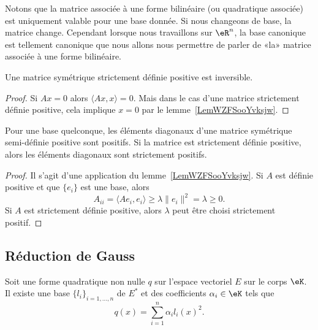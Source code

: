 \begin{normaltext}
    Notons que la matrice associée à une forme bilinéaire (ou quadratique associée) est uniquement valable pour une base donnée. Si nous changeons de base, la matrice change. Cependant lorsque nous travaillons sur \( \eR^n\), la base canonique est tellement canonique que nous allons nous permettre de parler de «la» matrice associée à une forme bilinéaire.
\end{normaltext}

\begin{corollary}
    Une matrice symétrique strictement définie positive est inversible.
\end{corollary}

\begin{proof}
    Si \( Ax=0\) alors \( \langle Ax, x\rangle =0\). Mais dans le cas d'une matrice strictement définie positive, cela implique \( x=0\) par le lemme~\ref{LemWZFSooYvksjw}.
\end{proof}

\begin{lemma}
    Pour une base quelconque, les éléments diagonaux d'une matrice symétrique semi-définie positive sont positifs. Si la matrice est strictement définie positive, alors les éléments diagonaux sont strictement positifs.
\end{lemma}

\begin{proof}
    Il s'agit d'une application du lemme~\ref{LemWZFSooYvksjw}. Si \( A\) est définie positive et que \( \{ e_i \}\) est une base, alors
    \begin{equation}
        A_{ii}=\langle Ae_i, e_i\rangle \geq \lambda\| e_i \|^2=\lambda\geq 0.
    \end{equation}
    Si \( A\) est strictement définie positive, alors \( \lambda\) peut être choisi strictement positif.
\end{proof}

\subsection{Réduction de Gauss}

\begin{theorem}     \label{THOooOMMFooKxqICS}
    Soit une forme quadratique non nulle \( q\) sur l'espace vectoriel \( E\) sur le corps \( \eK\). Il existe une base  \(\{ l_i \}_{i=1,\ldots, n}\) de \( E^*\) et des coefficients \( \alpha_i\in \eK\) tels que 
        \begin{equation}
            q(x)=\sum_{i=1}^n\alpha_il_i(x)^2.
        \end{equation}
\end{theorem}

